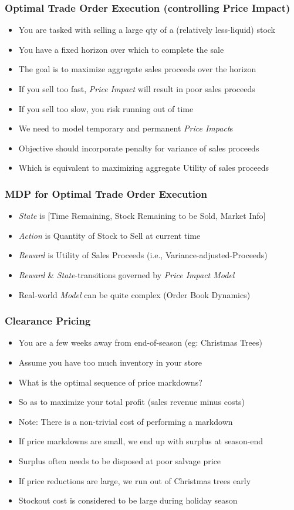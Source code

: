 \documentclass[handout]{beamer}
\begin{document}
\begin{frame}
\frametitle{Optimal Trade Order Execution (controlling Price Impact)}
\pause
\begin{itemize}[<+->]
\item You are tasked with selling a large qty of a (relatively less-liquid) stock
\item You have a fixed horizon over which to complete the sale
\item The goal is to maximize aggregate sales proceeds over the horizon
\item If you sell too fast, {\em Price Impact} will result in poor sales proceeds
\item If you sell too slow, you risk running out of time
\item We need to model temporary and permanent {\em Price Impact}s
\item Objective should incorporate penalty for variance of sales proceeds
\item Which is equivalent to maximizing aggregate Utility of sales proceeds 
\end{itemize}
\end{frame}

\begin{frame}
\frametitle{MDP for Optimal Trade Order Execution}
\pause
\begin{itemize}[<+->]
\item {\em State} is [Time Remaining, Stock Remaining to be Sold, Market Info]
\item {\em Action} is Quantity of Stock to Sell at current time
\item {\em Reward} is Utility of Sales Proceeds (i.e., Variance-adjusted-Proceeds)
\item {\em Reward} \& {\em State}-transitions governed by {\em Price Impact Model}
\item Real-world {\em Model} can be quite complex (Order Book Dynamics)
\end{itemize}
\end{frame}

\begin{frame}
\frametitle{Clearance Pricing}
\pause
\begin{itemize}[<+->]
\item You are a few weeks away from end-of-season (eg: Christmas Trees)
\item Assume you have too much inventory in your store
\item What is the optimal sequence of price markdowns?
\item So as to maximize your total profit (sales revenue minus costs)
\item Note: There is a non-trivial cost of performing a markdown
\item If price markdowns are small, we end up with surplus at season-end
\item Surplus often needs to be disposed at poor salvage price
\item If price reductions are large, we run out of Christmas trees early
\item Stockout cost is considered to be large during holiday season
\end{itemize}
\end{frame}
\end{document}

